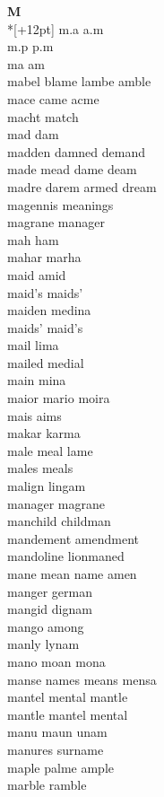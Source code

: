 \vspace{14pt}
\noindent\textbf{\Large M}\\*[+12pt]
m.a a.m\\
m.p p.m\\
ma am\\
mabel blame lambe amble\\
mace came acme\\
macht match\\
mad dam\\
madden damned demand\\
made mead dame deam\\
madre darem armed dream\\
magennis meanings\\
magrane manager\\
mah ham\\
mahar marha\\
maid amid\\
maid's maids'\\
maiden medina\\
maids' maid's\\
mail lima\\
mailed medial\\
main mina\\
maior mario moira\\
mais aims\\
makar karma\\
male meal lame\\
males meals\\
malign lingam\\
manager magrane\\
manchild childman\\
mandement amendment\\
mandoline lionmaned\\
mane mean name amen\\
manger german\\
mangid dignam\\
mango among\\
manly lynam\\
mano moan mona\\
manse names means mensa\\
mantel mental mantle\\
mantle mantel mental\\
manu maun unam\\
manures surname\\
maple palme ample\\
marble ramble\\
